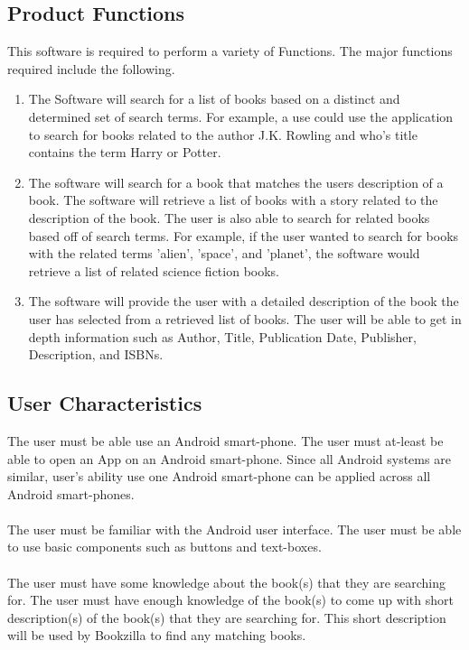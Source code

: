 \documentclass[12pt]{article}
\begin{document}
    \subsection{Product Functions}
    \label{sub:product_functions}
    This software is required to perform a variety of Functions. The major functions required include the following.
    \begin{enumerate}[1.]
        \item The Software will search for a list of books based on a distinct and determined set of search terms. For example, a use could use the application to search for books related to the author J.K. Rowling and who's title contains the term Harry or Potter. 
        
        \item The software will search for a book that matches the users description of a book. The software will retrieve a list of books with a story related to the description of the book. The user is also able to search for related books based off of search terms. For example, if the user wanted to search for books with the related terms 'alien', 'space', and 'planet', the software would retrieve a list of related science fiction books.
        
        \item The software will provide the user with a detailed description of the book the user has selected from a retrieved list of books. The user will be able to get in depth information such as Author, Title, Publication Date, Publisher, Description, and ISBNs. 
        
    \end{enumerate}
    
    \subsection{User Characteristics}
    \label{sub:user_characteristics}
    The user must be able use an Android smart-phone. The user must at-least be able to open an App on an Android smart-phone. Since all Android systems are similar, user's ability use one Android smart-phone can be applied across all Android smart-phones.\\\\
    \noindent The user must be familiar with the Android user interface. The user must be able to use basic components such as buttons and text-boxes.\\\\
    \noindent The user must have some knowledge about the book(s) that they are searching for. The user must have enough knowledge of the book(s) to come up with short description(s) of the book(s) that they are searching for. This short description will be used by Bookzilla to find any matching books.
    
\end{document}

